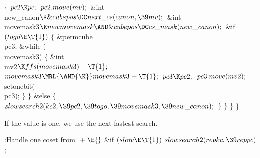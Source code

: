 ${}\{{}$\1\6
${}\\{pc2}\K\\{pc};{}$\6
${}\\{pc2}.\\{move}(\\{mv});{}$\7
\&{int} \\{new\_canon}${}\K\&{cubepos}\DC\\{next\_cs}(\\{canon},\39\\{mv});{}$\6
\&{int} \\{movemask3}${}\K\\{newmovemask}\AND\&{cubepos}\DC\\{cs\_mask}(\\{new%
\_canon});{}$\7
\&{if} ${}(\\{togo}\E\T{1}){}$\5
${}\{{}$\1\6
\&{permcube} \\{pc3};\7
\&{while} (\\{movemask3})\5
${}\{{}$\1\6
\&{int} \\{mv2}${}\K\\{ffs}(\\{movemask3})-\T{1};{}$\7
${}\\{movemask3}\MRL{\AND{\K}}\\{movemask3}-\T{1};{}$\6
${}\\{pc3}\K\\{pc2};{}$\6
${}\\{pc3}.\\{move}(\\{mv2});{}$\6
\\{setonebit}(\\{pc3});\6
\4${}\}{}$\2\6
\4${}\}{}$\2\6
\&{else}\5
${}\{{}$\1\6
${}\\{slowsearch2}(\\{kc2},\39\\{pc2},\39\\{togo},\39\\{movemask3},\39\\{new%
\_canon});{}$\6
\4${}\}{}$\2\6
\4${}\}{}$\2\6
\4${}\}{}$\2\6
\4${}\}{}$\2\par
\fi

If the  value is one, we use the next fastest search.

\Y\B\4:Handle one coset from \X${}\mathrel+\E{}$\6
\&{if} ${}(\\{slow}\E\T{1}){}$\1\5
${}\\{slowsearch2}(\\{repkc},\39\\{reppc}){}$;\2\par
\fi

